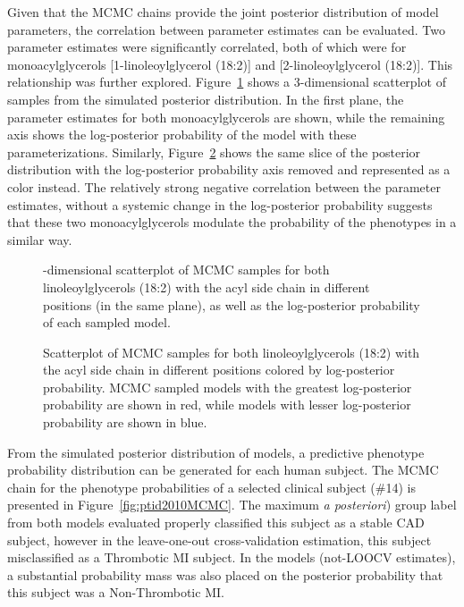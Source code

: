\begin{DoubleSpace*}
Given that the MCMC chains provide the joint posterior distribution of model parameters, the correlation between parameter estimates can be evaluated. Two parameter estimates were significantly correlated, both of which were for monoacylglycerols [1-linoleoylglycerol (18:2)] and [2-linoleoylglycerol (18:2)]. This relationship was further explored. Figure~\ref{fig:coefPost} shows a 3-dimensional scatterplot of samples from the simulated posterior distribution. In the first plane, the parameter estimates for both monoacylglycerols are shown, while the remaining axis shows the log-posterior probability of the model with these parameterizations.  Similarly, Figure~\ref{fig:coefPost2} shows the same slice of the posterior distribution with the log-posterior probability axis removed and represented as a color instead. The relatively strong negative correlation between the parameter estimates, without a systemic change in the log-posterior probability suggests that these two monoacylglycerols modulate the probability of the phenotypes in a similar way. 

\begin{figure}[H]
	\caption[3-dimensional scatterplot of MCMC samples for both linoleoylglycerols (18:2) with the acyl side chain in different positions and the log-posterior probability of each sampled model]{-dimensional scatterplot of MCMC samples for both linoleoylglycerols (18:2) with the acyl side chain in different positions (in the same plane), as well as the log-posterior probability of each sampled model. \label{fig:coefPost} }
\end{figure}

\begin{figure}[H]
	\caption[Scatterplot of MCMC samples for both linoleoylglycerols (18:2) with the acyl side chain in different positions colored by log-posterior probability]{\DoubleSpacing Scatterplot of MCMC samples for both linoleoylglycerols (18:2) with the acyl side chain in different positions colored by log-posterior probability. MCMC sampled models with the greatest log-posterior probability are shown in red, while models with lesser log-posterior probability are shown in blue. \label{fig:coefPost2} }
\end{figure}

From the simulated posterior distribution of models, a predictive phenotype probability distribution can be generated for each human subject. The MCMC chain for the phenotype probabilities of a selected clinical subject (\#14) is presented in Figure~\ref{fig:ptid2010MCMC}. The maximum \emph{a posteriori}) group label from both models evaluated properly classified this subject as a stable CAD subject, however in the leave-one-out cross-validation estimation, this subject misclassified as a Thrombotic MI subject. In the models (not-LOOCV estimates), a substantial probability mass was also placed on the posterior probability that this subject was a Non-Thrombotic MI.  


\end{DoubleSpace*}
